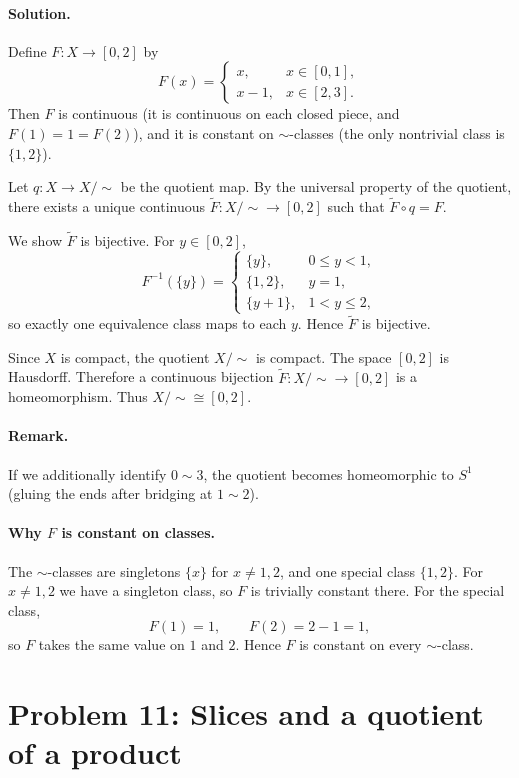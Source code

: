 \documentclass[12pt,a4paper]{article}
\theoremstyle{plain}
\theoremstyle{definition}
\theoremstyle{remark}
\theoremstyle{remark}
\begin{document}
	\paragraph{Solution.}
	Define $F:X\to[0,2]$ by
	\[
	F(x)=
	\begin{cases}
		x,& x\in[0,1],\\[2pt]
		x-1,& x\in[2,3].
	\end{cases}
	\]
	Then $F$ is continuous (it is continuous on each closed piece, and $F(1)=1=F(2)$), and it is constant on $\sim$-classes (the only nontrivial class is $\{1,2\}$).
	
	Let $q:X\to X/\!\sim$ be the quotient map. By the universal property of the quotient, there exists a unique continuous $\tilde F:X/\!\sim\to[0,2]$ such that $\tilde F\circ q=F$.
	
	We show $\tilde F$ is bijective. For $y\in[0,2]$,
	\[
	F^{-1}(\{y\})=
	\begin{cases}
		\{y\},& 0\le y<1,\\
		\{1,2\},& y=1,\\
		\{y+1\},& 1<y\le 2,
	\end{cases}
	\]
	so exactly one equivalence class maps to each $y$. Hence $\tilde F$ is bijective.
	
	Since $X$ is compact, the quotient $X/\!\sim$ is compact. The space $[0,2]$ is Hausdorff. Therefore a continuous bijection $\tilde F:X/\!\sim\to[0,2]$ is a homeomorphism. Thus $X/\!\sim \cong [0,2]$.
	
	\paragraph{Remark.}
	If we additionally identify $0\sim 3$, the quotient becomes homeomorphic to $S^1$ (gluing the ends after bridging at $1\sim2$).
	
	\paragraph{Why $F$ is constant on classes.}
	The $\sim$-classes are singletons $\{x\}$ for $x\neq 1,2$, and one special class $\{1,2\}$.
	For $x\neq 1,2$ we have a singleton class, so $F$ is trivially constant there.
	For the special class,
	\[
	F(1)=1,\qquad F(2)=2-1=1,
	\]
	so $F$ takes the same value on $1$ and $2$. Hence $F$ is constant on every $\sim$-class.
	
	\section*{Problem 11: Slices and a quotient of a product}
	
\end{document}
